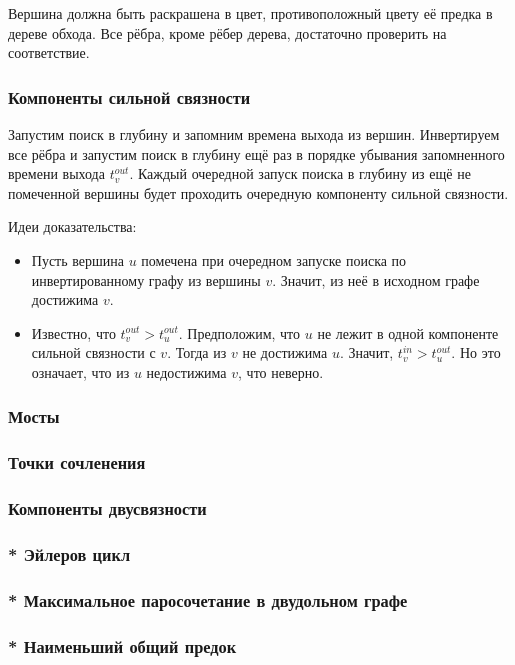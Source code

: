 \documentclass[a4paper,12pt]{article}
\begin{document}
      Вершина должна быть раскрашена в цвет, противоположный цвету
      её предка в дереве обхода. Все рёбра, кроме рёбер дерева,
      достаточно проверить на соответствие.

      \subsubsection{Компоненты сильной связности}

      Запустим поиск в глубину и запомним времена выхода из вершин.
      Инвертируем все рёбра и запустим поиск в глубину ещё раз
      в порядке убывания запомненного времени выхода $t^{out}_v$.
      Каждый очередной запуск поиска в глубину из ещё не помеченной
      вершины будет проходить очередную компоненту сильной связности.

      Идеи доказательства:
      \begin{itemize}
        \item Пусть вершина $u$ помечена при очередном запуске поиска
          по инвертированному графу из вершины $v$.
          Значит, из неё в исходном графе достижима $v$.
        \item Известно, что $t^{out}_v > t^{out}_u$.
          Предположим, что $u$ не лежит в одной компоненте сильной
          связности с $v$. Тогда из $v$ не достижима $u$. Значит,
          $t^{in}_v > t^{out}_u$. Но это означает, что из $u$
          недостижима $v$, что неверно.
      \end{itemize}

      \subsubsection{Мосты} 

      \subsubsection{Точки сочленения}

      \subsubsection{Компоненты двусвязности}

      \subsubsection{* Эйлеров цикл}

      \subsubsection{* Максимальное паросочетание в двудольном графе}

      \subsubsection{* Наименьший общий предок}
\end{document}
